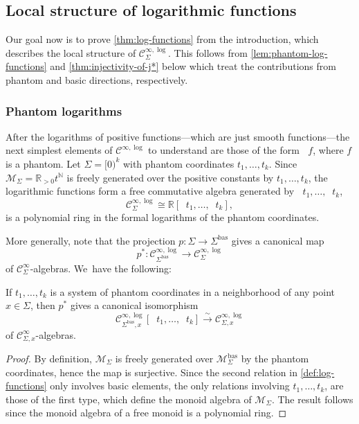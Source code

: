 \documentclass[10pt]{amsart}
\theoremstyle{definition}
\theoremstyle{remark}
\newenvironment{example}
  {\pushQED{\qed}\renewcommand{\qedsymbol}{$\lozenge$}\examplex}
  {\popQED\endexamplex}
\newcommand{\RR}{\mathbb{R}}
\newcommand{\NN}{\mathbb{N}}
\newcommand{\ulog}{\mathop{\widetilde{\log}}\nolimits}
\newcommand{\cM}{\mathscr{M}}
\newcommand{\cMbas}{\mathscr{M}^{\mathrm{bas}}}
\newcommand{\Cinf}[1]{\mathscr{C}^{\infty}_{#1}}
\newcommand{\Cinflog}[1]{\mathscr{C}^{\infty,\log}_{#1}}
\newcommand{\Sig}{\Sigma}
\newcommand{\bas}[1]{{#1}^{\mathrm{bas}}}
\newcommand{\Sigbas}{\bas{\Sig}}
\begin{document}
\subsection{Local structure of logarithmic functions}
Our goal now is to prove \autoref{thm:log-functions} from the introduction, which describes the local structure of $\Cinflog{\Sig}$. This follows from \autoref{lem:phantom-log-functions} and \autoref{thm:injectivity-of-j*} below which treat the contributions from phantom and basic directions, respectively.

\subsubsection{Phantom logarithms}
After the logarithms of positive functions---which are just smooth functions---the next simplest elements of $\Cinflog{}$ to understand are those of the form $\ulog f$, where $f$ is a phantom.
\begin{example}
Let $\Sig = [0)^k$ with phantom coordinates $t_1,\ldots,t_k$. Since $\cM_\Sig =\RR_{>0}t^\NN$ is freely generated over the positive constants by $t_1,\ldots,t_k$, the logarithmic functions form a free commutative algebra generated by $\ulog t_1,\ldots,\ulog t_k$, \ie
\[
\Cinflog{\Sig} \cong \RR[ \ulog t_1,\ldots,\ulog t_k],
\]
is a polynomial ring in the formal logarithms of the phantom coordinates.
\end{example}

More generally, note that the projection $p \colon \Sig \to \Sigbas$ gives a canonical map
\[
p^*\colon \Cinflog{\Sigbas}\to\Cinflog{\Sig}
\]
of $\Cinf{\Sig}$-algebras. We~have the following:
\begin{lemma}\label{lem:phantom-log-functions}
If $t_1,\ldots,t_k$ is a system of phantom coordinates in a neighborhood of any point $x \in \Sig$, then $p^*$ gives a canonical isomorphism
\[
\Cinflog{\Sigbas,x}[\ulog t_1,\ldots,\ulog t_k] \stackrel{\sim}{\to} \Cinflog{\Sig,x}
\]
of $\Cinf{\Sig,x}$-algebras.
\end{lemma}

\begin{proof}
By definition, $\cM_\Sig$ is freely generated over $\cMbas_{\Sig}$ by the phantom coordinates, hence the map is surjective. Since the second relation in \autoref{def:log-functions} only involves basic elements, the only relations involving $t_1,\ldots,t_k$, are those of the first type, which define the monoid algebra of $\cM_\Sig$. The result follows since the monoid algebra of a free monoid is a polynomial ring.
\end{proof}
\end{document}
